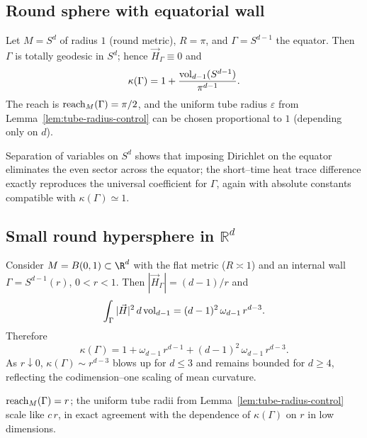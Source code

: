 \subsection{Round sphere with equatorial wall}
\label{subsec:equator}
Let $M=S^d$ of radius $1$ (round metric), $R=\pi$, and $\Gamma=S^{d-1}$ the equator.
Then $\Gamma$ is totally geodesic in $S^d$; hence $\vec H_\Gamma\equiv 0$ and
\[
\kappa(\Gamma)=1+\frac{\operatorname{vol}_{d-1}(S^{d-1})}{\pi^{d-1}}.
\]
The reach is $\operatorname{reach}_M(\Gamma)=\pi/2$, and the uniform tube radius $\varepsilon$ from Lemma~\ref{lem:tube-radius-control}
can be chosen proportional to $1$ (depending only on $d$).

\begin{remark}
Separation of variables on $S^d$ shows that imposing Dirichlet on the equator eliminates the even sector across the equator; the short–time heat trace difference exactly reproduces the universal coefficient for $\Gamma$, again with absolute constants compatible with $\kappa(\Gamma)\simeq 1$.
\end{remark}

\subsection{Small round hypersphere in $\mathbb{R}^d$}
\label{subsec:small-sphere}
Consider $M=B(0,1)\subset \R^d$ with the flat metric ($R\asymp 1$) and an internal wall $\Gamma=S^{d-1}(r)$, $0<r<1$.
Then $|\vec H_\Gamma|=(d-1)/r$ and
\[
\int_\Gamma |\vec H|^2\,d\operatorname{vol}_{d-1}=(d-1)^2\,\omega_{d-1}\,r^{d-3}.
\]
Therefore
\[
\kappa(\Gamma)=1+\omega_{d-1}\,r^{d-1}+ (d-1)^2\,\omega_{d-1}\,r^{d-3}.
\]
As $r\downarrow 0$, $\kappa(\Gamma)\sim r^{d-3}$ blows up for $d\le 3$ and remains bounded for $d\ge 4$,
reflecting the codimension–one scaling of mean curvature.

\begin{remark}
$\operatorname{reach}_M(\Gamma)=r$; the uniform tube radii from Lemma~\ref{lem:tube-radius-control} scale like $c\,r$,
in exact agreement with the dependence of $\kappa(\Gamma)$ on $r$ in low dimensions.
\end{remark}

